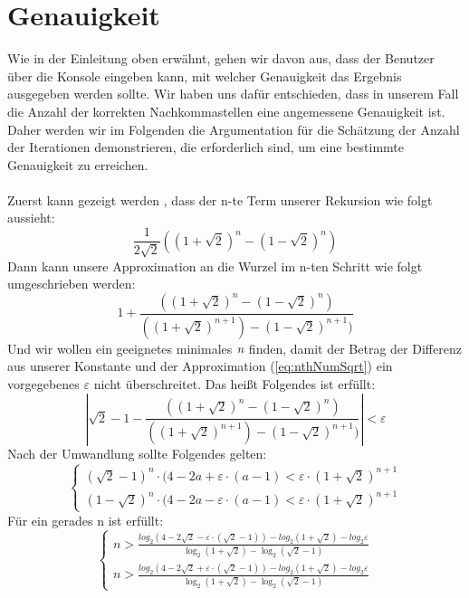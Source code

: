 \documentclass[course=erap]{aspdoc}
\begin{document}
\section{Genauigkeit}
Wie in der Einleitung oben erwähnt, gehen wir davon aus, dass der Benutzer über die Konsole eingeben kann, mit welcher Genauigkeit das Ergebnis ausgegeben werden sollte. Wir haben uns dafür entschieden, dass in unserem Fall die Anzahl der korrekten Nachkommastellen eine angemessene Genauigkeit ist. Daher werden wir im Folgenden die Argumentation für die Schätzung der Anzahl der Iterationen demonstrieren, die erforderlich sind, um eine bestimmte Genauigkeit zu erreichen.\\ 
\\Zuerst kann gezeigt werden \cite{Primzahlen}, dass der n-te Term unserer Rekursion wie folgt aussieht:
\begin{equation}\label{eq:nthNum}
\frac{1}{2\sqrt{2}}((1+\sqrt{2})^n-(1-\sqrt{2})^n)
\end{equation}
Dann kann unsere Approximation an die Wurzel im n-ten Schritt wie folgt umgeschrieben werden:
\begin{equation}\label{eq:nthNumSqrt}
1+\frac{((1+\sqrt{2})^n-(1-\sqrt{2})^n)}{((1+\sqrt{2})^{n+1})-(1-\sqrt{2})^{n+1})}
\end{equation}
Und wir wollen ein geeignetes minimales $\emph{n}$ finden, damit der Betrag der Differenz aus unserer Konstante und der Approximation (\ref{eq:nthNumSqrt}) ein vorgegebenes $\varepsilon$ nicht überschreitet. Das heißt Folgendes ist erfüllt:
\begin{equation}\label{eq:errAprx}
|\sqrt{2}-1-\frac{((1+\sqrt{2})^n-(1-\sqrt{2})^n)}{((1+\sqrt{2})^{n+1})-(1-\sqrt{2})^{n+1})}|<\varepsilon
\end{equation}
Nach der Umwandlung sollte Folgendes gelten:
\begin{equation*}\label{eq:error2} 
\begin{cases} 
(\sqrt{2}-1)^n\cdot(4-2a+\varepsilon\cdot(a-1)<\varepsilon\cdot(1+\sqrt{2})^{n+1}
\\ (1-\sqrt{2})^n\cdot(4-2a-\varepsilon\cdot(a-1)<\varepsilon\cdot(1+\sqrt{2})^{n+1}
\end{cases}
\end{equation*}
Für ein gerades n ist erfüllt:
\begin{equation}\label{eq:errorLog} 
\begin{cases} 
n>\frac{log_2{(4-2\sqrt{2}-\varepsilon\cdot(\sqrt{2}-1))}-log_2{(1+\sqrt{2})}-log_2{\varepsilon}}{\log_2{(1+\sqrt{2})-\log_2{(\sqrt{2}-1)}}}
\\ n>\frac{log_2{(4-2\sqrt{2}+\varepsilon\cdot(\sqrt{2}-1))}-log_2{(1+\sqrt{2})}-log_2{\varepsilon}}{\log_2{(1+\sqrt{2})-\log_2{(\sqrt{2}-1)}}}
\end{cases}
\end{equation}
\end{document}

